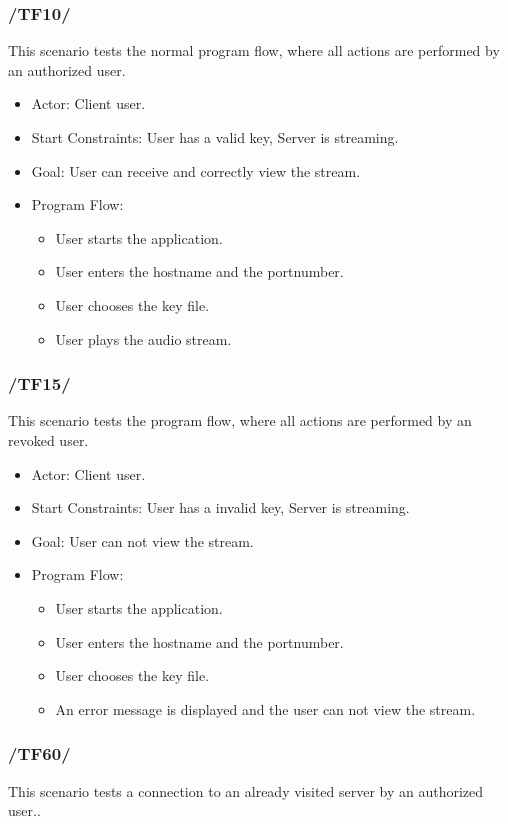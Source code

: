 \documentclass[a4paper,10pt]{scrartcl}
\begin{document}
\subsubsection{/TF10/}
This scenario tests the normal program flow, where all actions are performed by an authorized user.

\begin{itemize}
	\item Actor: Client user.
	\item Start Constraints: User has a valid key, Server is streaming.
	\item Goal: User can receive and correctly view the stream.
	\item Program Flow:
	\begin{itemize}
   \item User starts the application.
   \item User enters the hostname and the portnumber.
   \item User chooses the key file.
   \item User plays the audio stream.
\end{itemize}
\end{itemize}

\subsubsection{/TF15/}
This scenario tests the program flow, where all actions are performed by an revoked user.

\begin{itemize}
	\item Actor: Client user.
	\item Start Constraints: User has a invalid key, Server is streaming.
	\item Goal: User can not view the stream.
	\item Program Flow:
	\begin{itemize}
   \item User starts the application.
   \item User enters the hostname and the portnumber.
   \item User chooses the key file.
   \item An error message is displayed and the user can not view the stream.
\end{itemize}
\end{itemize}

\subsubsection{/TF60/}
This scenario tests a connection to an already visited server by an authorized user..
\end{document}

